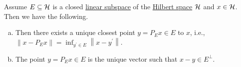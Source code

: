 \begin{theorem}\label{thm:orthogonality-principle}
	Assume \(E\subseteq \mathcal{\MakeUppercase{h}} \) is a closed \hyperref[def:linear-vector-space]{linear subspace} of the \hyperref[def:Hilbert-space]{Hilbert space} \(\mathcal{\MakeUppercase{h}} \) and \(x\in \mathcal{\MakeUppercase{h}} \). Then we have the following.
	\begin{enumerate}[(a)]
		\item Then there exists a unique closest point \(y = P_E x\in E\) to \(x\), i.e., \(\left\lVert x - P_E x\right\rVert = \inf _{y^\prime \in E} \left\lVert x - y^\prime \right\rVert \).
		\item The point \(y = P_E x\in E\) is the unique vector such that \(x - y\in E^{\perp}\).
	\end{enumerate}
	\begin{figure}[H]
		\centering
	\end{figure}
\end{theorem}
